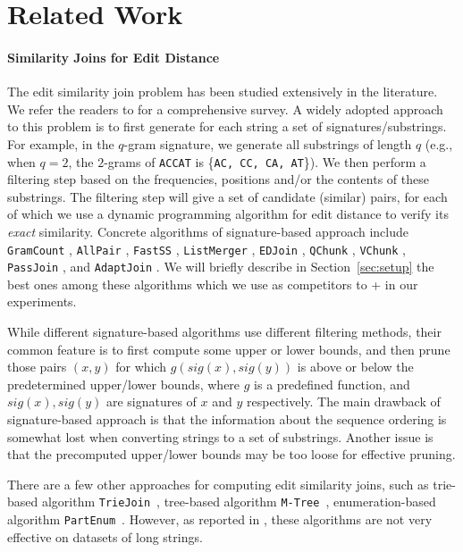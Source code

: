 \section{Related Work}
\label{sec:related}

\paragraph{Similarity Joins for Edit Distance}
The edit similarity join problem has been studied extensively in the literature.  We refer the readers to \cite{JLFL14} for a comprehensive survey.  A widely adopted approach to this problem is to first generate for each string a set of signatures/substrings. For example, in the $q$-gram signature, we generate all substrings of length $q$ (e.g., when $q=2$, the $2$-grams of {\tt ACCAT} is \{{\tt AC, CC, CA, AT}\}). We then perform a filtering step based on the frequencies, positions and/or the contents of these substrings.  The filtering step will give a set of candidate (similar) pairs, for each of which we use a dynamic programming algorithm for edit distance to verify its {\em exact} similarity.  Concrete algorithms of signature-based approach include {\tt GramCount} \cite{GJKMS01}, {\tt AllPair} \cite{BMS07}, {\tt FastSS} \cite{BHSH07}, 
{\tt ListMerger} \cite{LLL08}, {\tt EDJoin} \cite{XWL08}, {\tt QChunk} \cite{QWL11}, {\tt VChunk} \cite{WQX13}, {\tt PassJoin} \cite{LDW11}, and {\tt AdaptJoin} \cite{WLF12}.  We will briefly describe in Section~\ref{sec:setup} the best ones among these algorithms which we use as competitors to \ebdjoin+ in our experiments.

While different signature-based algorithms use different filtering methods, their common feature is to first compute some upper or lower bounds, and then prune those pairs $(x, y)$ for which $g(sig(x), sig(y))$ is above or below the predetermined upper/lower bounds, where $g$ is a predefined function, and $sig(x), sig(y)$ are signatures of $x$ and $y$ respectively.  The main drawback of signature-based approach is that the information about the sequence ordering is somewhat lost when converting strings to a set of substrings.  Another issue is that the precomputed upper/lower bounds may be too loose for effective pruning.  

There are a few other approaches for computing edit similarity joins, such as trie-based algorithm {\tt TrieJoin}~\cite{WLF10}, tree-based algorithm {\tt M-Tree}~\cite{CPZ97}, enumeration-based algorithm {\tt PartEnum}~\cite{AGK06}.  However, as reported in \cite{JLFL14}, these algorithms are not very effective on datasets of long strings.


